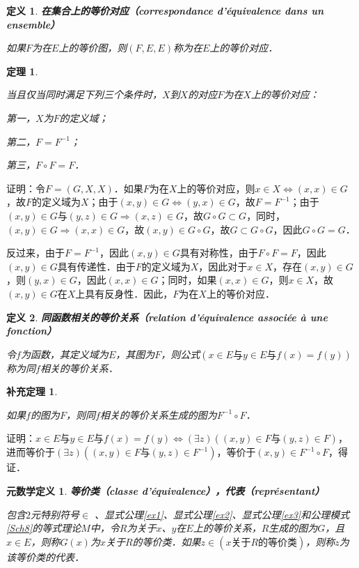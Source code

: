 \documentclass[12pt, a4paper, oneside]{book}
\newtheorem{metadef}{元数学定义}
\newtheorem{theo}{定理}
\newtheorem{cor}{补充定理}
\newtheorem{de}{定义}
\begin{document}
			\begin{de}
				\textbf{在集合上的等价对应（correspondance d'équivalence dans un ensemble）}
				\par
				如果$F$为在$E$上的等价图，则$(F, E, E)$称为在$E$上的等价对应．
			\end{de}
			
			\begin{theo}\label{theo56}
				\hfill\par
				当且仅当同时满足下列三个条件时，$X$到$X$的对应$F$为在$X$上的等价对应：
				\par
				第一，$X$为$F$的定义域；
				\par
				第二，$F=F^{-1}$；
				\par
				第三，$F\circ F= F$．
			\end{theo}
			证明：令$F=(G, X, X)$．如果$F$为在$X$上的等价对应，则$x\in X\Leftrightarrow (x, x)\in G$，故$F$的定义域为$X$；由于$(x, y)\in G\Leftrightarrow (y, x)\in G$，故$F=F^{-1}$；由于$(x, y)\in G\text{与}(y, z) \in G\Rightarrow (x, z)\in G$，故$G\circ G\subset G$，同时，$(x, y)\in G\Rightarrow (x, x)\in G$，故$(x, y)\in G\circ G$，故$G\subset G\circ G$，因此$G\circ G=G$．
			\par
			反过来，由于$F=F^{-1}$，因此$(x, y)\in G具有对称性$，由于$F\circ F= F$，因此$(x, y)\in G$具有传递性．由于$F$的定义域为$X$，因此对于$x\in X$，存在$(x, y)\in G$，则$(y, x) \in G$，因此$(x, x)\in G$；同时，如果$(x, x)\in G$，则$x\in X$，故$(x, y)\in G$在$X$上具有反身性．因此，$F$为在$X$上的等价对应．

			\begin{de}
				\textbf{同函数相关的等价关系（relation d'équivalence associée à une fonction）}
				\par
				令$f$为函数，其定义域为$E$，其图为$F$，则公式$(x\in E\text{与}y\in E\text{与}f(x)=f(y))$称为同$f$相关的等价关系．
			\end{de}
			
			\begin{cor}\label{cor147}
				\hfill\par
				如果$f$的图为$F$，则同$f$相关的等价关系生成的图为$F^{-1}\circ F$．
			\end{cor}
			证明：$x\in E\text{与}y\in E\text{与}f(x)=f(y)\Leftrightarrow (\exists z)((x, y)\in F\text{与}(y, z)\in F)$，进而等价于$(\exists z)((x, y)\in F\text{与}(y, z)\in F^{-1})$，等价于$(x, y)\in F^{-1}\circ F$，得证．

			\begin{metadef}
				\textbf{等价类（classe d'équivalence），代表（représentant）}
				\par
				包含$2$元特别符号$\in$ 、显式公理\ref{ex1}、显式公理\ref{ex2}、显式公理\ref{ex3}和公理模式\ref{Sch8}的等式理论$M$中，令$R$为关于$x$、$y$在$E$上的等价关系，$R$生成的图为$G$，且$x\in E$，则称$G(x)$为$x$关于$R$的等价类．如果$z\in (x\text{关于}R\text{的等价类})$，则称$z$为该等价类的代表．
			\end{metadef}
\end{document}
